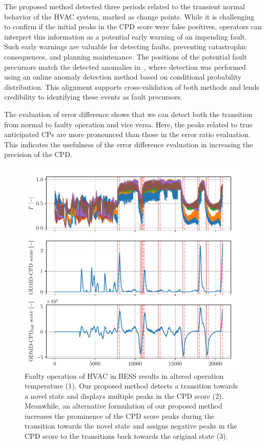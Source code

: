 The proposed method detected three periods related to the transient normal behavior of the HVAC system, marked as change points. While it is challenging to confirm if the initial peaks in the CPD score were false positives, operators can interpret this information as a potential early warning of an impending fault. Such early warnings are valuable for detecting faults, preventing catastrophic consequences, and planning maintenance. The positions of the potential fault precursors match the detected anomalies in~\citet{Wadinger2024}, where detection was performed using an online anomaly detection method based on conditional probability distribution. This alignment supports cross-validation of both methods and lends credibility to identifying these events as fault precursors.

The evaluation of error difference shows that we can detect both the transition from normal to faulty operation and vice versa. Here, the peaks related to true anticipated CPs are more pronounced than those in the error ratio evaluation. This indicates the usefulness of the error difference evaluation in increasing the precision of the CPD\@.

\begin{figure}[H]
	\centering
	\includegraphics[width=\linewidth]{figures/bess-chd_p10-l2880_b240_t240roll_2880-dmd_w1.0-hx20.pdf}
	\caption{Faulty operation of HVAC in BESS results in altered operation temperature (1). Our proposed method detects a transition towards a novel state and displays multiple peaks in the CPD score (2). Meanwhile, an alternative formulation of our proposed method increases the prominence of the CPD score peaks during the transition towards the novel state and assigns negative peaks in the CPD score to the transitions back towards the original state (3).}\label{fig:bess}
\end{figure}

